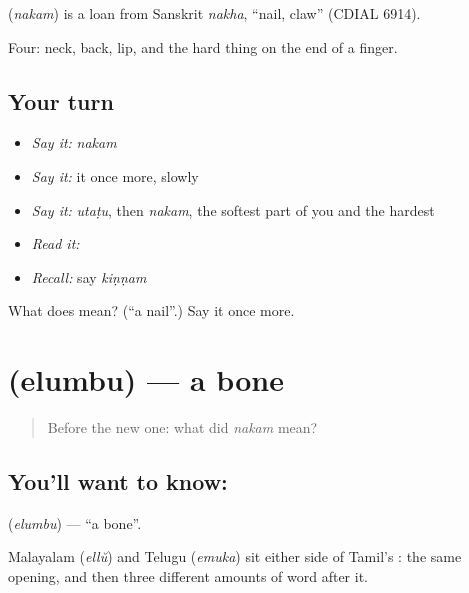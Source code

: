\begin{cousinweb}
\textbf{} (\emph{nakam}) is a loan from Sanskrit \emph{nakha}, \textquotedblleft{}nail, claw\textquotedblright{} (CDIAL 6914).
\end{cousinweb}

\begin{grammarlens}[title={What you've built}]
Four: neck, back, lip, and the hard thing on the end of a finger.
\end{grammarlens}

\subsection*{Your turn}
\begin{itemize}
\raggedright
  \item \emph{Say it:} \emph{nakam}
  \item \emph{Say it:} it once more, slowly
  \item \emph{Say it:} \emph{utaṭu}, then \emph{nakam}, the softest part of you and the hardest
  \item \emph{Read it:} \textbf{}
  \item \emph{Recall:} say \emph{kiṇṇam}
\end{itemize}

\begin{tcolorbox}[breakable,colback=teal!4,colframe=teal!35!black,title={Before you move on}]
What does  mean? (\textquotedblleft{}a nail\textquotedblright{}.) Say it once more.
\end{tcolorbox}
\section[\texorpdfstring{\ta{எலும்பு} (elumbu)}{எலும்பு (elumbu)}]{ (elumbu) — a bone}

\label{lesson:TA-C55-bone}



\begin{quote}
Before the new one: what did \emph{nakam} mean?
\end{quote}

\subsection*{You'll want to know: }
\textbf{} (\emph{elumbu}) — \textquotedblleft{}a bone\textquotedblright{}.

Malayalam  (\emph{ellŭ}) and Telugu  (\emph{emuka}) sit either side of Tamil's : the same opening, and then three different amounts of word after it.

